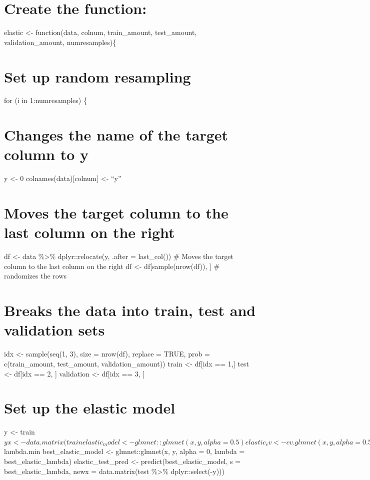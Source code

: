 \documentclass[
]{book}
\begin{document}
\chapter{Create the function:}\label{create-the-function-3}

elastic \textless- function(data, colnum, train\_amount, test\_amount,
validation\_amount, numresamples)\{

\chapter{Set up random resampling}\label{set-up-random-resampling-3}

for (i in 1:numresamples) \{

\chapter{Changes the name of the target column to y}\label{changes-the-name-of-the-target-column-to-y-3}

y \textless- 0 colnames(data){[}colnum{]} \textless- ``y''

\chapter{Moves the target column to the last column on the right}\label{moves-the-target-column-to-the-last-column-on-the-right-3}

df \textless- data \%\textgreater\% dplyr::relocate(y, .after = last\_col()) \# Moves the
target column to the last column on the right df \textless-
df{[}sample(nrow(df)), {]} \# randomizes the rows

\chapter{Breaks the data into train, test and validation sets}\label{breaks-the-data-into-train-test-and-validation-sets-3}

idx \textless- sample(seq(1, 3), size = nrow(df), replace = TRUE, prob =
c(train\_amount, test\_amount, validation\_amount)) train \textless- df{[}idx == 1,{]} test \textless- df{[}idx == 2, {]} validation \textless- df{[}idx == 3, {]}

\chapter{Set up the elastic model}\label{set-up-the-elastic-model}

y \textless- train\(y
x <- data.matrix(train %
elastic_model <- glmnet::glmnet(x, y, alpha = 0.5)
elastic_cv <- cv.glmnet(x, y, alpha = 0.5)
best_elastic_lambda <- elastic_cv\)lambda.min best\_elastic\_model \textless-
glmnet::glmnet(x, y, alpha = 0, lambda = best\_elastic\_lambda)
elastic\_test\_pred \textless- predict(best\_elastic\_model, s =
best\_elastic\_lambda, newx = data.matrix(test \%\textgreater\% dplyr::select(-y)))
\end{document}
